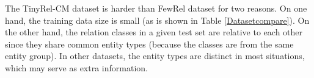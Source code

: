 The TinyRel-CM dataset is harder than FewRel dataset for two reasons. On one hand, the training data size is small (as is shown in Table \ref{Datasetcompare}). On the other hand, the relation classes in a given test set are relative to each other since they share common entity types (because the classes are from the same entity group). In other datasets, the entity types are distinct in most situations, which may serve as extra information. %

%
